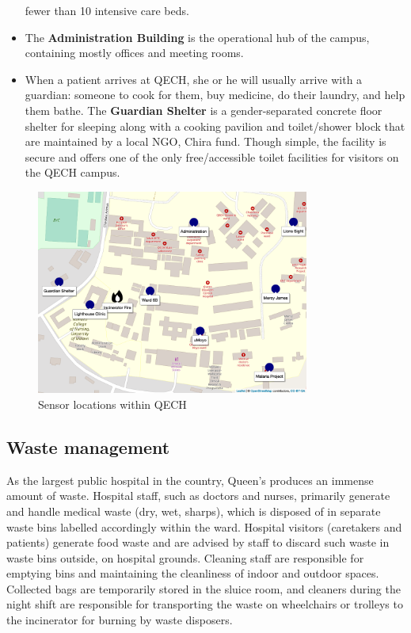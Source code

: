 \documentclass[
  authoryear,
  review,
  3p]{elsarticle}
\begin{document}
\begin{itemize}
  fewer than 10 intensive care beds.
\item
  The \textbf{Administration Building} is the operational hub of the
  campus, containing mostly offices and meeting rooms.
\item
  When a patient arrives at QECH, she or he will usually arrive with a
  guardian: someone to cook for them, buy medicine, do their laundry,
  and help them bathe. The \textbf{Guardian Shelter} is a
  gender-separated concrete floor shelter for sleeping along with a
  cooking pavilion and toilet/shower block that are maintained by a
  local NGO, Chira fund. Though simple, the facility is secure and
  offers one of the only free/accessible toilet facilities for visitors
  on the QECH campus.
\end{itemize}

\begin{figure}

{\centering \includegraphics[width=0.8\textwidth,height=\textheight]{figs/map-sensores-qech-blantyre.png}

}

\caption{\label{fig-map-sensors}Sensor locations within QECH}

\end{figure}

\hypertarget{waste-management}{%
\subsection{Waste management}\label{waste-management}}

As the largest public hospital in the country, Queen's produces an
immense amount of waste. Hospital staff, such as doctors and nurses,
primarily generate and handle medical waste (dry, wet, sharps), which is
disposed of in separate waste bins labelled accordingly within the ward.
Hospital visitors (caretakers and patients) generate food waste and are
advised by staff to discard such waste in waste bins outside, on
hospital grounds. Cleaning staff are responsible for emptying bins and
maintaining the cleanliness of indoor and outdoor spaces. Collected bags
are temporarily stored in the sluice room, and cleaners during the night
shift are responsible for transporting the waste on wheelchairs or
trolleys to the incinerator for burning by waste disposers.
\end{document}
